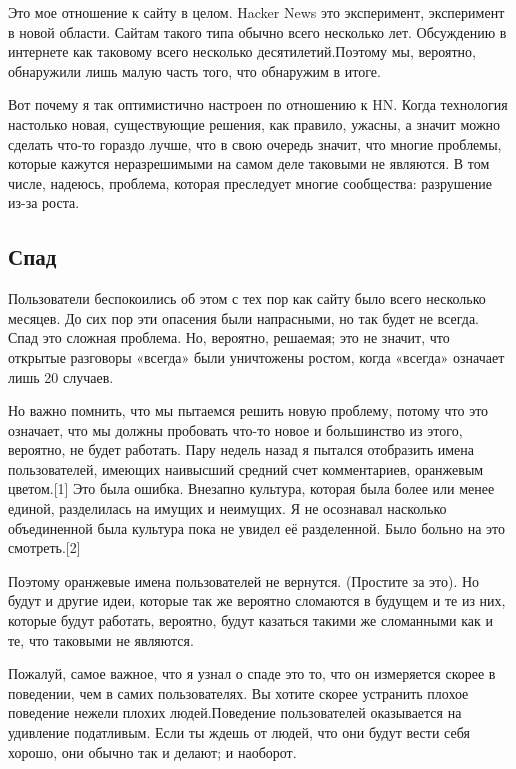 \documentclass[ebook,12pt,oneside,openany]{memoir}
\begin{document}
Это мое отношение к сайту в целом. Hacker News это эксперимент,
эксперимент в новой области. Сайтам такого типа обычно всего несколько
лет. Обсуждению в интернете как таковому всего несколько
десятилетий.Поэтому мы, вероятно, обнаружили лишь малую часть того,
что обнаружим в итоге. \newline

Вот почему я так оптимистично настроен по отношению к HN. Когда
технология настолько новая, существующие решения, как правило, ужасны,
а значит можно сделать что-то гораздо лучше, что в свою очередь
значит, что многие проблемы, которые кажутся неразрешимыми на самом
деле таковыми не являются. В том числе, надеюсь, проблема, которая
преследует многие сообщества: разрушение из-за роста. \newline

\subsection{Спад}

Пользователи беспокоились об этом с тех пор как сайту было всего
несколько месяцев. До сих пор эти опасения были напрасными, но так
будет не всегда. Спад это сложная проблема. Но, вероятно, решаемая;
это не значит, что открытые разговоры «всегда» были уничтожены ростом,
когда «всегда» означает лишь 20 случаев. \newline

Но важно помнить, что мы пытаемся решить новую проблему, потому что
это означает, что мы должны пробовать что-то новое и большинство из
этого, вероятно, не будет работать. Пару недель назад я пытался
отобразить имена пользователей, имеющих наивысший средний счет
комментариев, оранжевым цветом.[1] Это была ошибка. Внезапно культура,
которая была более или менее единой, разделилась на имущих и неимущих.
Я не осознавал насколько объединенной была культура пока не увидел её
разделенной. Было больно на это смотреть.[2] \newline

Поэтому оранжевые имена пользователей не вернутся. (Простите за это).
Но будут и другие идеи, которые так же вероятно сломаются в будущем и
те из них, которые будут работать, вероятно, будут казаться такими же
сломанными как и те, что таковыми не являются. \newline

Пожалуй, самое важное, что я узнал о спаде это то, что он измеряется
скорее в поведении, чем в самих пользователях. Вы хотите скорее
устранить плохое поведение нежели плохих людей.Поведение пользователей
оказывается на удивление податливым. Если ты ждешь от людей, что они
будут вести себя хорошо, они обычно так и делают; и наоборот. \newline
\end{document}
